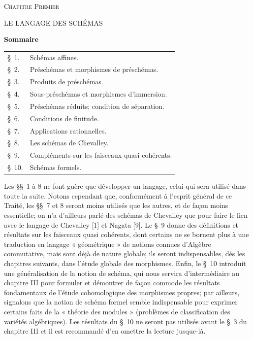 
\begin{center}
\textsc{Chapitre Premier}

LE LANGAGE DES SCHÉMAS

\textbf{Sommaire}
\end{center}

\begin{tabular}{ll}
\S\ 1. & Schémas affines.\\
\S\ 2. & Préschémas et morphismes de préschémas.\\
\S\ 3. & Produits de préschémas.\\
\S\ 4. & Sous-préschémas et morphismes d'immersion.\\
\S\ 5. & Préschémas réduits; condition de séparation.\\
\S\ 6. & Conditions de finitude.\\
\S\ 7. & Applications rationnelles.\\
\S\ 8. & Les schémas de Chevalley.\\
\S\ 9. & Compléments sur les faisceaux quasi cohérents.\\
\S\ 10. & Schémas formels.
\end{tabular}

Les \S\S\ 1 à 8 ne font guère que développer un langage, celui qui sera utilisé dans toute la suite. Notons cependant que, conformément à l'esprit général de ce Traité, les \S\S\ 7 et 8 seront moins utilisés que les autres, et de façon moins essentielle; on n'a d'ailleurs parlé des schémas de Chevalley que pour faire le lien avec le langage de Chevalley [1] et Nagata [9]. Le \S\ 9 donne des définitions et résultats sur les faisceaux quasi cohérents, dont certains ne se bornent plus à une traduction en langage « géométrique » de notions connues d'Algèbre commutative, mais sont déjà de nature globale; ils seront indispensables, dès les chapitres suivants, dans l'étude globale des morphismes. Enfin, le \S\ 10 introduit une généralisation de la notion de schéma, qui nous servira d'intermédiaire au chapitre III pour formuler et démontrer de façon commode les résultats fondamentaux de l'étude cohomologique des morphismes propres; par ailleurs, signalons que la notion de schéma formel semble indispensable pour exprimer certains faits de la « théorie des modules » (problèmes de classification des variétés algébriques). Les résultats du \S\ 10 ne seront pas utilisés avant le \S\ 3 du chapitre III et il est recommandé d'en omettre la lecture jusque-là.


